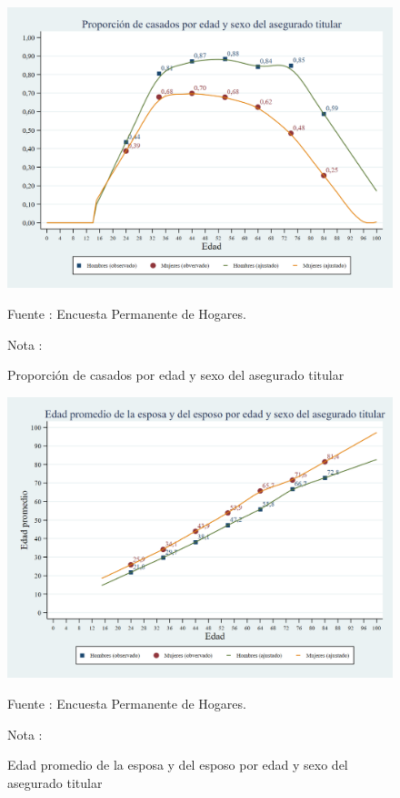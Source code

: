 \begin{figure}[H]
\begin{center}
                    \caption{Proporción de casados por edad y sexo del asegurado titular}
                    \includegraphics[scale=0.35]{EPH_familia_prop_casado.png}
                                    \item \footnotesize Fuente : Encuesta Permanente de Hogares.
                                    \item \footnotesize Nota : 
                    \end{center}
\end{figure}

\begin{figure}[H]
\begin{center}
                    \caption{Edad promedio de la esposa y del esposo por edad y sexo del asegurado titular}
                    \includegraphics[scale=0.35]{EPH_familia_edadmed_esposa.png}
                                    \item \footnotesize Fuente : Encuesta Permanente de Hogares.
                                    \item \footnotesize Nota : 
                    \end{center}
\end{figure}

